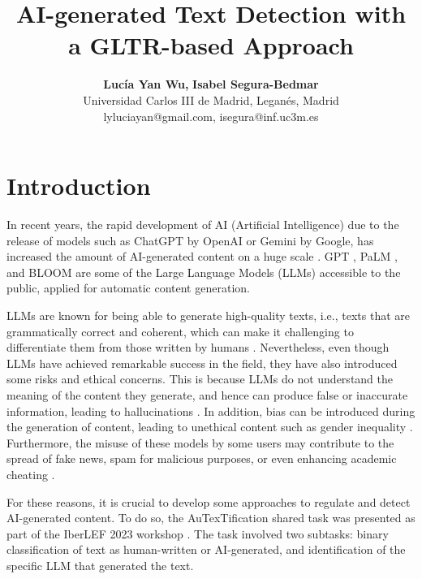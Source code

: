 \documentclass[a4paper,11pt,twocolumn,twoside]{article}
\title{AI-generated Text Detection with a GLTR-based Approach}
\author {\textbf{Lucía Yan Wu,} \textbf{Isabel Segura-Bedmar}\\
Universidad Carlos III de Madrid, Leganés, Madrid\\
lyluciayan@gmail.com, isegura@inf.uc3m.es\\
}
\begin{document}

\setlength\titlebox{25cm} %


\label{firstpage} \maketitle

%

\section{Introduction}

In recent years, the rapid development of AI (Artificial Intelligence) due to the release of models such as ChatGPT by OpenAI or Gemini by Google, has increased the amount of AI-generated content on a huge scale \cite{martínez2023combining}. GPT \cite{openai2024gpt4}, PaLM \cite{chowdhery2022palm}, and BLOOM \cite{workshop2023bloom} are some of the Large Language Models (LLMs) accessible to the public, applied for automatic content generation. 

LLMs are known for being able to generate high-quality texts, i.e., texts that are grammatically correct and coherent, which can make it challenging to differentiate them from those written by humans \cite{llm-risks-bublak}. Nevertheless, even though LLMs have achieved remarkable success in the field, they have also introduced some risks and ethical concerns. This is because LLMs do not understand the meaning of the content they generate, and hence can produce false or inaccurate information, leading to hallucinations \cite{huang2023survey}. In addition, bias can be introduced during the generation of content, leading to unethical content such as gender inequality \cite{unesco-llm-bias}. Furthermore, the misuse of these models by some users may contribute to the spread of fake news, spam for malicious purposes, or even enhancing academic cheating \cite{llm-risks-upwork} \cite{llm-risks-heldt}.

For these reasons, it is crucial to develop some approaches to regulate and detect AI-generated content. To do so, the AuTexTification \cite{autextification} shared task was presented as part of the IberLEF 2023 workshop \cite{jimenez2023overview}. The task involved two subtasks: binary classification of text as human-written or AI-generated, and identification of the specific LLM that generated the text.
\end{document}

